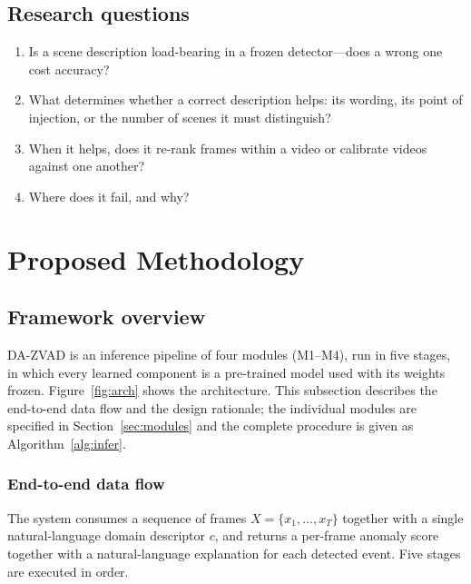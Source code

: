 \documentclass[a4paper,fleqn]{cas-sc}
\begin{document}
\subsection{Research questions}
\begin{enumerate}[RQ1.]
  \item Is a scene description load-bearing in a frozen detector---does a wrong one
        cost accuracy?
  \item What determines whether a correct description helps: its wording, its point
        of injection, or the number of scenes it must distinguish?
  \item When it helps, does it re-rank frames within a video or calibrate videos
        against one another?
  \item Where does it fail, and why?
\end{enumerate}

\section{Proposed Methodology}
\label{sec:method}

\subsection{Framework overview}
DA-ZVAD is an inference pipeline of four modules (M1--M4), run in five stages,
in which every learned component is a pre-trained model used with its weights
frozen. Figure~\ref{fig:arch} shows the
architecture. This subsection describes the end-to-end data flow and the design
rationale; the individual modules are specified in Section~\ref{sec:modules} and
the complete procedure is given as Algorithm~\ref{alg:infer}.

\subsubsection{End-to-end data flow}
The system consumes a sequence of frames $X = \{x_1,\dots,x_T\}$ together with a
single natural-language domain descriptor $c$, and returns a per-frame anomaly
score together with a natural-language explanation for each detected event. Five
stages are executed in order.
\end{document}

